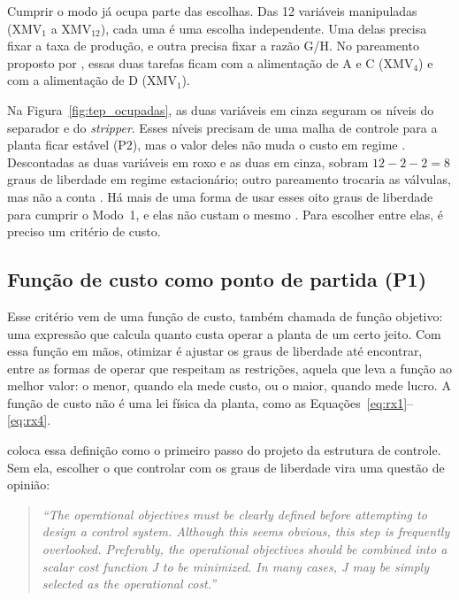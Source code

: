 Cumprir o modo já ocupa parte das escolhas. Das 12 variáveis manipuladas (XMV$_1$ a XMV$_{12}$), cada uma é uma escolha independente. Uma delas precisa fixar a taxa de produção, e outra precisa fixar a razão G/H. No pareamento proposto por , essas duas tarefas ficam com a alimentação de A e C (XMV$_4$) e com a alimentação de D (XMV$_1$).

Na Figura~\ref{fig:tep_ocupadas}, as duas variáveis em cinza seguram os níveis do separador e do \textit{stripper}. Esses níveis precisam de uma malha de controle para a planta ficar estável (P2), mas o valor deles não muda o custo em regime \cite{Larsson2001}. Descontadas as duas variáveis em roxo e as duas em cinza, sobram $12 - 2 - 2 = 8$ graus de liberdade em regime estacionário; outro pareamento trocaria as válvulas, mas não a conta \cite{Larsson2001}. Há mais de uma forma de usar esses oito graus de liberdade para cumprir o Modo~1, e elas não custam o mesmo \cite{DOWNS1993}. Para escolher entre elas, é preciso um critério de custo.

\subsection{Função de custo como ponto de partida (P1)}
\label{subsec:custo}

Esse critério vem de uma função de custo, também chamada de função objetivo: uma expressão que calcula quanto custa operar a planta de um certo jeito. Com essa função em mãos, otimizar é ajustar os graus de liberdade até encontrar, entre as formas de operar que respeitam as restrições, aquela que leva a função ao melhor valor: o menor, quando ela mede custo, ou o maior, quando mede lucro. A função de custo não é uma lei física da planta, como as Equações~\ref{eq:rx1}--\ref{eq:rx4}.

 coloca essa definição como o primeiro passo do projeto da estrutura de controle. Sem ela, escolher o que controlar com os graus de liberdade vira uma questão de opinião:

\begin{quote}
	\textit{``The operational objectives must be clearly defined before attempting to design a control system. Although this seems obvious, this step is frequently overlooked. Preferably, the operational objectives should be combined into a scalar cost function J to be minimized. In many cases, J may be simply selected as the operational cost.''} \cite{Skogestad2004}
\end{quote}

